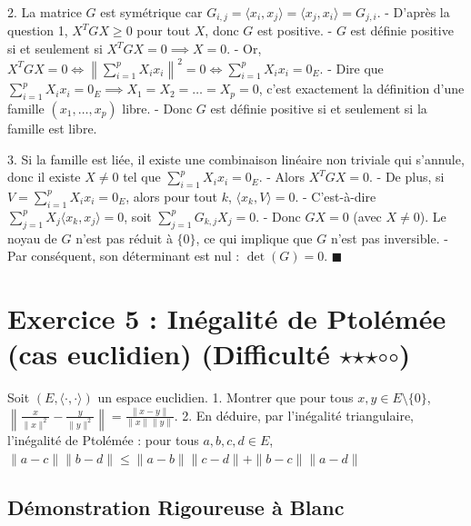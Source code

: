 \documentclass{report}
\begin{document}
2. La matrice $G$ est symétrique car $G_{i,j} = \langle x_i, x_j \rangle = \langle x_j, x_i \rangle = G_{j,i}$.
   - D'après la question 1, $X^T G X \ge 0$ pour tout $X$, donc $G$ est positive.
   - $G$ est définie positive si et seulement si $X^T G X = 0 \implies X = 0$.
   - Or, $X^T G X = 0 \iff \left\| \sum_{i=1}^p X_i x_i \right\|^2 = 0 \iff \sum_{i=1}^p X_i x_i = 0_E$.
   - Dire que $\sum_{i=1}^p X_i x_i = 0_E \implies X_1 = X_2 = \ldots = X_p = 0$, c'est exactement la définition d'une famille $(x_1, \ldots, x_p)$ libre.
   - Donc $G$ est définie positive si et seulement si la famille est libre.

3. Si la famille est liée, il existe une combinaison linéaire non triviale qui s'annule, donc il existe $X \neq 0$ tel que $\sum_{i=1}^p X_i x_i = 0_E$.
   - Alors $X^T G X = 0$.
   - De plus, si $V = \sum_{i=1}^p X_i x_i = 0_E$, alors pour tout $k$, $\langle x_k, V \rangle = 0$.
   - C'est-à-dire $\sum_{j=1}^p X_j \langle x_k, x_j \rangle = 0$, soit $\sum_{j=1}^p G_{k,j} X_j = 0$.
   - Donc $GX = 0$ (avec $X \neq 0$). Le noyau de $G$ n'est pas réduit à $\{0\}$, ce qui implique que $G$ n'est pas inversible.
   - Par conséquent, son déterminant est nul : $\det(G) = 0$.
   $\blacksquare$

\newpage


\chapter*{Exercice 5 : Inégalité de Ptolémée (cas euclidien) (Difficulté $\star$$\star$$\star$$\circ$$\circ$)}

Soit $(E, \langle \cdot, \cdot \rangle)$ un espace euclidien.
1. Montrer que pour tous $x, y \in E \setminus \{0\}$, $\left\| \frac{x}{\|x\|^2} - \frac{y}{\|y\|^2} \right\| = \frac{\|x - y\|}{\|x\| \|y\|}$.
2. En déduire, par l'inégalité triangulaire, l'inégalité de Ptolémée : pour tous $a, b, c, d \in E$,
$ \|a - c\| \|b - d\| \le \|a - b\| \|c - d\| + \|b - c\| \|a - d\| $

\section*{Démonstration Rigoureuse à Blanc}
\end{document}
